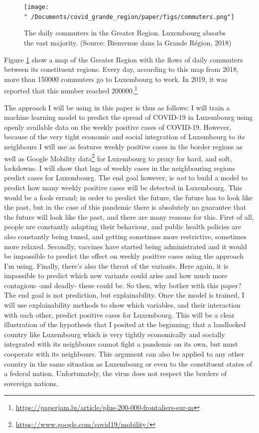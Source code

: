 \documentclass{article}
\begin{document}
\begin{figure}
  \centering
  \texttt{[image: "~/Documents/covid\_grande\_region/paper/figs/commuters.png"]}
  \caption{The daily commuters in the Greater Region. Luxembourg absorbs the vast majority. (Source: Bienvenue dans la Grande Région, 2018)}
  \label{commuters}
\end{figure}

Figure \ref{commuters} show a map of the Greater Region with the flows
of daily commuters between its constituent regions. Every day, according
to this map from 2018, more than 150000 commuters go to Luxembourg to
work. In 2019, it was reported that this number reached
200000.\footnote{\url{https://paperjam.lu/article/plus-200-000-frontaliers-sur-m}}

The approach I will be using in this paper is thus as follows: I will
train a machine learning model to predict the spread of COVID-19 in
Luxembourg using openly available data on the weekly positive cases of
COVID-19. However, because of the very tight economic and social
integration of Luxembourg to its neighbours I will use as features
weekly positive cases in the border regions as well as Google Mobility
data\footnote{\url{https://www.google.com/covid19/mobility/}} for
Luxembourg to proxy for hard, and soft, lockdowns. I will show that lags
of weekly cases in the neighbouring regions predict cases for
Luxembourg. The end goal however, is \emph{not} to build a model to
predict how many weekly positive cases will be detected in Luxembourg.
This would be a fools errand; in order to predict the future, the future
has to look like the past, but in the case of this pandemic there is
absolutely no guarantee that the future will look like the past, and
there are many reasons for this. First of all, people are constantly
adapting their behaviour, and public health policies are also constantly
being tuned, and getting sometimes more restrictive, sometimes more
relaxed. Secondly, vaccines have started being administrated and it
would be impossible to predict the effect on weekly positive cases using
the approach I'm using. Finally, there's also the threat of the
variants. Here again, it is impossible to predict which new variants
could arise and how much more contagious -and deadly- these could be. So
then, why bother with this paper? The end goal is not prediction, but
explainability. Once the model is trained, I will use explainability
methods to show which variables, and their interaction with each other,
predict positive cases for Luxembourg. This will be a clear illustration
of the hypothesis that I posited at the beginning; that a landlocked
country like Luxembourg which is very tightly economically and socially
integrated with its neighbours cannot fight a pandemic on its own, but
must cooperate with its neighbours. This argument can also be applied to
any other country in the same situation as Luxembourg or even to the
constituent states of a federal nation. Unfortunately, the virus does
not respect the borders of sovereign nations.
\end{document}
